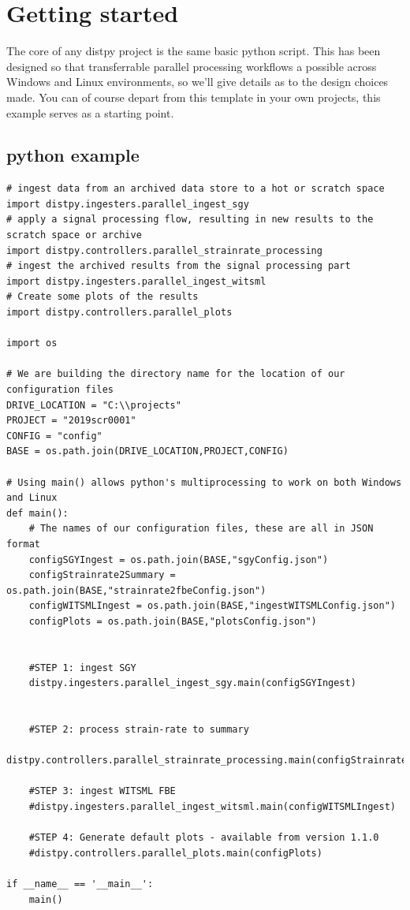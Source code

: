 \section{Getting started}

The core of any distpy project is the same basic python script.
This has been designed so that transferrable parallel processing workflows a possible across Windows and Linux environments, so we'll
give details as to the design choices made.
You can of course depart from this template in your own projects, this example serves as a starting point.

\subsection{python  example}
\begin{lstlisting}
# ingest data from an archived data store to a hot or scratch space
import distpy.ingesters.parallel_ingest_sgy
# apply a signal processing flow, resulting in new results to the scratch space or archive
import distpy.controllers.parallel_strainrate_processing
# ingest the archived results from the signal processing part 
import distpy.ingesters.parallel_ingest_witsml
# Create some plots of the results
import distpy.controllers.parallel_plots

import os

# We are building the directory name for the location of our configuration files 
DRIVE_LOCATION = "C:\\projects"
PROJECT = "2019scr0001"
CONFIG = "config"
BASE = os.path.join(DRIVE_LOCATION,PROJECT,CONFIG)

# Using main() allows python's multiprocessing to work on both Windows and Linux
def main():
    # The names of our configuration files, these are all in JSON format
    configSGYIngest = os.path.join(BASE,"sgyConfig.json")
    configStrainrate2Summary = os.path.join(BASE,"strainrate2fbeConfig.json")
    configWITSMLIngest = os.path.join(BASE,"ingestWITSMLConfig.json")
    configPlots = os.path.join(BASE,"plotsConfig.json")
    

    #STEP 1: ingest SGY 
    distpy.ingesters.parallel_ingest_sgy.main(configSGYIngest)
    

    #STEP 2: process strain-rate to summary
    distpy.controllers.parallel_strainrate_processing.main(configStrainrate2Summary)

    #STEP 3: ingest WITSML FBE
    #distpy.ingesters.parallel_ingest_witsml.main(configWITSMLIngest)

    #STEP 4: Generate default plots - available from version 1.1.0
    #distpy.controllers.parallel_plots.main(configPlots)

if __name__ == '__main__':
    main()
\end{lstlisting}
